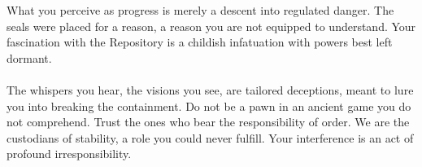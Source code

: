 \documentclass{article}
\begin{document}
\begin{infobox}
What you perceive as progress is merely a descent into regulated danger. The seals were placed for a reason, a reason you are not equipped to understand. Your fascination with the Repository is a childish infatuation with powers best left dormant. \\
\\
The whispers you hear, the visions you see, are tailored deceptions, meant to lure you into breaking the containment. Do not be a pawn in an ancient game you do not comprehend. Trust the ones who bear the responsibility of order. We are the custodians of stability, a role you could never fulfill. Your interference is an act of profound irresponsibility.
\end{infobox}
\end{document}
